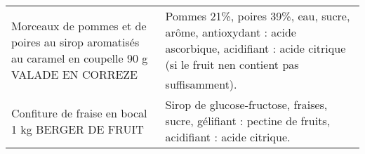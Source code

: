 \begin{longtable}{p{5cm}p{10cm}}
        Morceaux de pommes et de poires au sirop aromatisés au caramel en coupelle 90 g VALADE EN CORREZE &                                                                                                                                                                                                                                                                                                                                                                                                                                                                                                                                                                                                                                                                                                                                                                                                                                                                                     Pommes 21\%, poires 39\%, eau, sucre, arôme, antioxydant : acide ascorbique, acidifiant : acide citrique (si le fruit nen contient pas suffisamment). \\
                                                        Confiture de fraise en bocal 1 kg BERGER DE FRUIT &                                                                                                                                                                                                                                                                                                                                                                                                                                                                                                                                                                                                                                                                                                                                                                                                                                                                                                                                   Sirop de glucose-fructose, fraises, sucre, gélifiant : pectine de fruits, acidifiant : acide citrique. \\

\end{longtable}
